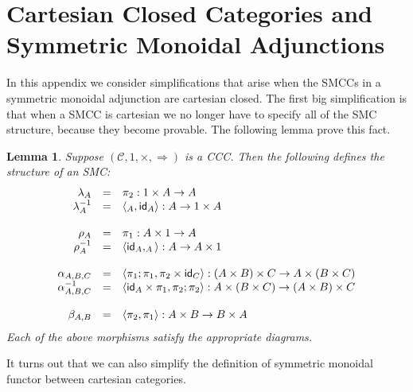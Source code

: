 \documentclass{article}
\let\mto\to
\let\to\relax
\newcommand{\to}{\rightarrow}
\let\t\relax
\newcommand{\cat}[1]{\mathcal{#1}}
\newcommand{\id}[0]{\mathsf{id}}
\newcommand{\t}[0]{\mathsf{t}}
\newtheorem{lemma}[theorem]{Lemma}
\begin{document}
\section{Cartesian Closed Categories and Symmetric Monoidal Adjunctions}
\label{sec:cartesian_closed_categories_and_symmetric_monoidal_adjunctions}
In this appendix we consider simplifications that arise when the SMCCs
in a symmetric monoidal adjunction are cartesian closed.  The first
big simplification is that when a SMCC is cartesian we no longer have
to specify all of the SMC structure, because they become provable.
The following lemma prove this fact.

\begin{lemma}
  \label{lemma:CCC-is-SMC}
  Suppose $(\cat{C}, 1, \times, \Rightarrow)$ is a CCC.  Then the
  following defines the structure of an SMC:
  \[
  \begin{array}{rll}
    \lambda_A & = & \pi_2 : 1 \times A \mto A\\
    \lambda^{-1}_A & = & \langle \t_A , \id_A  \rangle : A \mto 1 \times A\\
    \\
    \rho_A & = & \pi_1 : A \times 1 \mto A\\
    \rho^{-1}_A & = & \langle \id_A , \t_A  \rangle : A \mto A \times 1\\
    \\
    \alpha_{A,B,C} & = & \langle \pi_1;\pi_1, \pi_2 \times \id_C \rangle : (A \times B) \times C \mto A \times (B \times C)\\
    \alpha^{-1}_{A,B,C} & = & \langle \id_A \times \pi_1, \pi_2;\pi_2 \rangle : A \times (B \times C) \mto (A \times B) \times C\\
    \\
    \beta_{A,B} & = & \langle \pi_2, \pi_1 \rangle : A \times B \mto B \times A\\
  \end{array}
  \]
  Each of the above morphisms satisfy the appropriate diagrams.
\end{lemma}

It turns out that we can also simplify the definition of symmetric
monoidal functor between cartesian categories.
\end{document}
